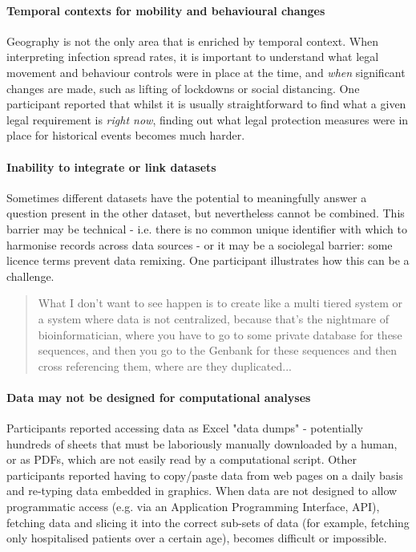 \documentclass{CUP-JNL-DAP}%
\begin{document}
\paragraph{Temporal contexts for mobility and behavioural changes}
Geography is not the only area that is enriched by temporal context. When interpreting infection spread rates, it is important to understand what legal movement and behaviour controls were in place at the time, and \textit{when} significant changes are made, such as lifting of lockdowns or social distancing. One participant reported that whilst it is usually straightforward to find what a given legal requirement is \textit{right now}, finding out what legal protection measures were in place for historical events becomes much harder. 

\paragraph{Inability to integrate or link datasets}
Sometimes different datasets have the potential to meaningfully answer a question present in the other dataset, but nevertheless cannot be combined. This barrier may be technical - i.e. there is no common unique identifier with which to harmonise records across data sources - or it may be a sociolegal barrier: some licence terms prevent data remixing. One participant illustrates how this can be a challenge.

\blockquote{What I don't want to see happen is to create like a multi tiered system or a system where data is not centralized, because that's the nightmare of bioinformatician, where you have to go to some private database for these sequences, and then you go to the Genbank for these sequences and then cross referencing them, where are they duplicated...}

\paragraph{Data may not be designed for computational analyses}

Participants reported accessing data as Excel "data dumps" - potentially hundreds of sheets that must be laboriously manually downloaded by a human, or as PDFs, which are not easily read by a computational script. Other participants reported having to copy/paste data from web pages on a daily basis and re-typing data embedded in graphics. When data are not designed to allow programmatic access (e.g. via an Application Programming Interface, API), fetching data and slicing it into the correct sub-sets of data (for example, fetching only hospitalised patients over a certain age), becomes difficult or impossible. 
\end{document}
